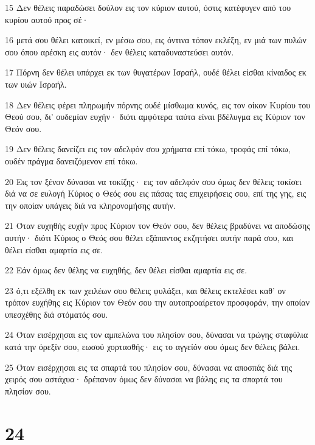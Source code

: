 \par 15 Δεν θέλεις παραδώσει δούλον εις τον κύριον αυτού, όστις κατέφυγεν από του κυρίου αυτού προς σέ·
\par 16 μετά σου θέλει κατοικεί, εν μέσω σου, εις όντινα τόπον εκλέξη, εν μιά των πυλών σου όπου αρέσκη εις αυτόν· δεν θέλεις καταδυναστεύσει αυτόν.
\par 17 Πόρνη δεν θέλει υπάρχει εκ των θυγατέρων Ισραήλ, ουδέ θέλει είσθαι κίναιδος εκ των υιών Ισραήλ.
\par 18 Δεν θέλεις φέρει πληρωμήν πόρνης ουδέ μίσθωμα κυνός, εις τον οίκον Κυρίου του Θεού σου, δι' ουδεμίαν ευχήν· διότι αμφότερα ταύτα είναι βδέλυγμα εις Κύριον τον Θεόν σου.
\par 19 Δεν θέλεις δανείζει εις τον αδελφόν σου χρήματα επί τόκω, τροφάς επί τόκω, ουδέν πράγμα δανειζόμενον επί τόκω.
\par 20 Εις τον ξένον δύνασαι να τοκίζης· εις τον αδελφόν σου όμως δεν θέλεις τοκίσει διά να σε ευλογή Κύριος ο Θεός σου εις πάσας τας επιχειρήσεις σου, επί της γης, εις την οποίαν υπάγεις διά να κληρονομήσης αυτήν.
\par 21 Όταν ευχηθής ευχήν προς Κύριον τον Θεόν σου, δεν θέλεις βραδύνει να αποδώσης αυτήν· διότι Κύριος ο Θεός σου θέλει εξάπαντος εκζητήσει αυτήν παρά σου, και θέλει είσθαι αμαρτία εις σε.
\par 22 Εάν όμως δεν θέλης να ευχηθής, δεν θέλει είσθαι αμαρτία εις σε.
\par 23 ό,τι εξέλθη εκ των χειλέων σου θέλεις φυλάξει, και θέλεις εκτελέσει καθ' ον τρόπον ευχήθης εις Κύριον τον Θεόν σου την αυτοπροαίρετον προσφοράν, την οποίαν υπεσχέθης διά στόματός σου.
\par 24 Όταν εισέρχησαι εις τον αμπελώνα του πλησίον σου, δύνασαι να τρώγης σταφύλια κατά την όρεξίν σου, εωσού χορτασθής· εις το αγγείόν σου όμως δεν θέλεις βάλει.
\par 25 Όταν εισέρχησαι εις τα σπαρτά του πλησίον σου, δύνασαι να αποσπάς διά της χειρός σου αστάχυα· δρέπανον όμως δεν δύνασαι να βάλης εις τα σπαρτά του πλησίον σου.

\chapter{24}

